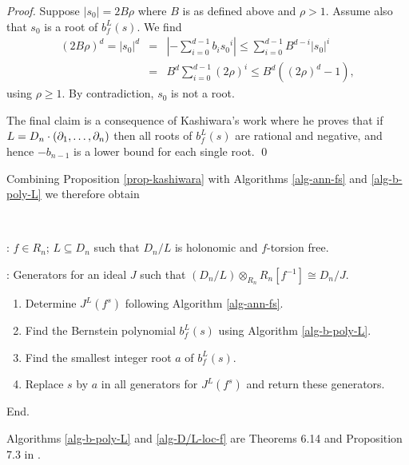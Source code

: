 \begin{proof}
Suppose
$|s_0|=2B\rho$ where $B$ is as defined above and $\rho>1$. 
Assume 
also that $s_0$ is a root of $b_f^L(s)$. We find
\begin{eqnarray*}
(2B\rho)^d=|s_0|^d&=&|-\sum_{i=0}^{d-1}b_i{s_0}^i|
\le\sum_{i=0}^{d-1}B^{d-i}|s_0|^i\\
&=&B^d\sum_{i=0}^{d-1}(2\rho)^i
\le B^d((2\rho)^d-1),
\end{eqnarray*}
using $\rho\geq 1$.
By contradiction, $s_0$ is not a root.

The
final claim is a consequence of Kashiwara's work
 \cite{DM:K} where
he proves that if $L=D_n\cdot(\partial_1,\ldots,\partial_n)$ then  all roots of
$b_f^L(s)$ are rational and negative, and hence 
$-b_{n-1}$ is a 
lower bound for each single root.
\qed
\end{proof}

Combining Proposition \ref{prop-kashiwara} 
with Algorithms 
\ref{alg-ann-fs} 
and  
\ref{alg-b-poly-L} 
we therefore obtain
\begin{alg}[Localization]~

: 
 $f\in R_n$; $L\subseteq D_n$ such that $D_n/L$ is holonomic and
$f$-torsion free. 

: 
 Generators for an ideal $J$ such that $(D_n/L)\otimes_{R_n}
 R_n[f^{-1}]\cong D_n/J$.

\begin{enumerate}
\item Determine $J^L(f^s)$ following Algorithm \ref{alg-ann-fs}. 
\item Find the Bernstein polynomial $b_f^L(s)$ using Algorithm
\ref{alg-b-poly-L}. 
\item Find the smallest integer root $a$ of $b_f^L(s)$.
\item Replace $s$ by $a$ in all generators for $J^L(f^s)$ and
return these generators.
\end{enumerate}
End.
\end{alg}
Algorithms \ref{alg-b-poly-L} and \ref{alg-D/L-loc-f} are 
Theorems 6.14 and Proposition 7.3 in \cite{DM:Oa3}.

